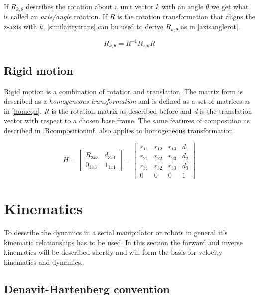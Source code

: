 If $R_{k,\theta}$ describes the rotation about a unit vector $k$ with an angle $\theta$ we get what is called an \textit{axis/angle} rotation. If $R$ is the rotation transformation that aligns the z-axis with $k$, \eqref{similaritytrans} can bu used to derive $R_{k,\theta}$ as in \eqref{axisanglerot}.

\begin{equation}\label{axisanglerot}
R_{k,\theta} = R^{-1} R_{z,\theta} R
\end{equation}

\subsection{Rigid motion}

Rigid motion is a combination of rotation and translation. The matrix form is described as a \textit{homogeneous transformation} and is defined as a set of matrices as in \eqref{homeqn}. \textit{R} is the rotation matrix as described before and \textit{d} is the translation vector with respect to a chosen base frame. The same features of composition as described in \eqref{Rcompositioninf} also applies to homogeneous transformation.

\begin{equation}\label{homeqn}
H = \begin{bmatrix}
R_{3x3} & d_{3x1}\\ 
0_{1x3} & 1_{1x1}
\end{bmatrix}=\begin{bmatrix}
r_{11} & r_{12} & r_{13} & d_{1}\\ 
r_{21} & r_{22} & r_{23} & d_{2}\\ 
r_{31} & r_{32} & r_{33} & d_{3}\\ 
0 & 0 & 0 & 1
\end{bmatrix}
\end{equation}


\section{Kinematics}

To describe the dynamics in a serial manipulator or robots in general it's kinematic relationships has to be used. In this section the forward and inverse kinematics will be described shortly and will form the basis for velocity kinematics and dynamics.

\subsection{Denavit-Hartenberg convention}

